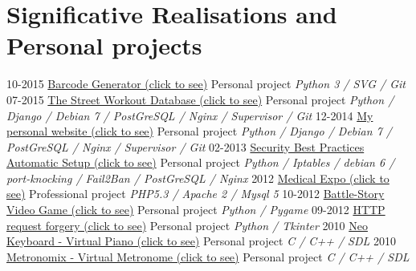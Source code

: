 \documentclass[]{friggeri-cv}
\begin{document}
\section{Significative Realisations and Personal projects}
\begin{entrylist}
  \entry
    {10-2015}
    {\href{http://pypi.python.org/pypi/barcode-generator/0.1rc15}{Barcode Generator (click to see)}}
    {Personal project}
    {\emph{Python 3 / SVG / Git}}
  \entry
    {07-2015}
    {\href{http://www.the-street-workout-database.ovh}{The Street Workout Database (click to see)}}
    {Personal project}
    {\emph{Python / Django / Debian 7 / PostGreSQL / Nginx / Supervisor / Git}}
  \entry
    {12-2014}
    {\href{http:www.herve-beraud.ovh}{My personal website (click to see)}}
    {Personal project}
    {\emph{Python / Django / Debian 7 / PostGreSQL / Nginx / Supervisor / Git}}
  \entry
    {02-2013}
    {\href{https://github.com/4383/fabric-debian/}{Security Best Practices Automatic Setup (click to see)}}
    {Personal project}
    {\emph{Python / Iptables /  debian 6 / port-knocking / Fail2Ban / PostGreSQL / Nginx}}
  \entry
    {2012}
    {\href{http://medical-expo.com}{Medical Expo (click to see)}}
    {Professional project}
    {\emph{PHP5.3 / Apache 2 / Mysql 5}}
  \entry
    {10-2012}
    {\href{http://github.com/4383/battle-story/}{Battle-Story Video Game (click to see)}}
    {Personal project}
    {\emph{Python / Pygame}}
  \entry
    {09-2012}
    {\href{http://github.com/4383/WebForge/}{HTTP request forgery (click to see)}}
    {Personal project}
    {\emph{Python / Tkinter}}
  \entry
    {2010}
    {\href{http://fr.wikipedia.org/wiki/Neo\_Keyboard}{Neo Keyboard - Virtual Piano (click to see)}}
    {Personal project}
    {\emph{C / C++ / SDL}}
  \entry
    {2010}
    {\href{http://fr.wikipedia.org/wiki/Metronomix}{Metronomix - Virtual Metronome (click to see)}}
    {Personal project}
    {\emph{C / C++ / SDL}}
\end{entrylist}
\end{document}
